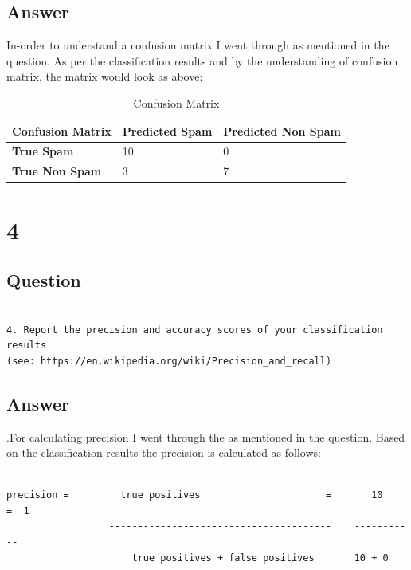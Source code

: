 \documentclass[letterpaper,11pt]{article}
\begin{document}
\clearpage
\subsection*{Answer}

In-order to understand a confusion matrix I went through \cite{conref} as mentioned in the question. As per the classification results and by the understanding of confusion matrix, the matrix would look as above:


\begin{table}
\begin{tabular}{ | l | l | p{8.2cm} | }
\hline
\textbf{Confusion Matrix} & \textbf{Predicted Spam} & \textbf{Predicted Non Spam} \\
\hline
\textbf{True Spam} & 10  & 0 \\
\hline
\textbf{True Non Spam} & 3 & 7 \\
\hline
\end{tabular}
\caption{Confusion Matrix}
\label{table:conf}
\end{table}

\clearpage


\section*{4}

\subsection*{Question}

\begin{verbatim}

4. Report the precision and accuracy scores of your classification results
(see: https://en.wikipedia.org/wiki/Precision_and_recall)

\end{verbatim}

\clearpage
\subsection*{Answer}

.For calculating precision I went through the \cite{precref} as mentioned in the question. Based on the classification results the precision is calculated as follows:

\begin{verbatim}

precision =         true positives                      =       10        =  1
                  ---------------------------------------    -----------
                      true positives + false positives       10 + 0

\end{verbatim}
\end{document}
